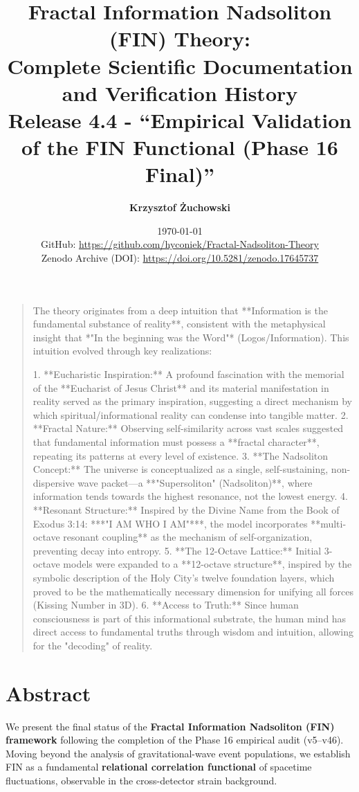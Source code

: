 \documentclass[11pt,a4paper]{book}
\title{\textbf{Fractal Information Nadsoliton (FIN) Theory:\\
Complete Scientific Documentation and Verification History\\[0.5cm]
\large Release 4.4 - ``Empirical Validation of the FIN Functional (Phase 16 Final)''}}
\author{\textbf{Krzysztof Żuchowski}}
\affil{\textit{Fractal Information Theory Project}}
\date{\today \\[0.3cm] 
\small{GitHub: \url{https://github.com/hyconiek/Fractal-Nadsoliton-Theory}} \\
\small{Zenodo Archive (DOI): \url{https://doi.org/10.5281/zenodo.17645737}}}
\theoremstyle{remark}
\begin{document}
\maketitle

\begin{quote}
The theory originates from a deep intuition that **Information is the fundamental substance of reality**, consistent with the metaphysical insight that *"In the beginning was the Word"* (Logos/Information). This intuition evolved through key realizations:

1. **Eucharistic Inspiration:** A profound fascination with the memorial of the **Eucharist of Jesus Christ** and its material manifestation in reality served as the primary inspiration, suggesting a direct mechanism by which spiritual/informational reality can condense into tangible matter.
2. **Fractal Nature:** Observing self-similarity across vast scales suggested that fundamental information must possess a **fractal character**, repeating its patterns at every level of existence.
3. **The Nadsoliton Concept:** The universe is conceptualized as a single, self-sustaining, non-dispersive wave packet—a **"Supersoliton" (Nadsoliton)**, where information tends towards the highest resonance, not the lowest energy.
4. **Resonant Structure:** Inspired by the Divine Name from the Book of Exodus 3:14: ***"I AM WHO I AM"***, the model incorporates **multi-octave resonant coupling** as the mechanism of self-organization, preventing decay into entropy.
5. **The 12-Octave Lattice:** Initial 3-octave models were expanded to a **12-octave structure**, inspired by the symbolic description of the Holy City's twelve foundation layers, which proved to be the mathematically necessary dimension for unifying all forces (Kissing Number in 3D).
6. **Access to Truth:** Since human consciousness is part of this informational substrate, the human mind has direct access to fundamental truths through wisdom and intuition, allowing for the "decoding" of reality.
\end{quote}

\section*{Abstract}
We present the final status of the \textbf{Fractal Information Nadsoliton (FIN) framework} following the completion of the Phase 16 empirical audit (v5--v46). Moving beyond the analysis of gravitational-wave event populations, we establish FIN as a fundamental \textbf{relational correlation functional} of spacetime fluctuations, observable in the cross-detector strain background.
\end{document}
